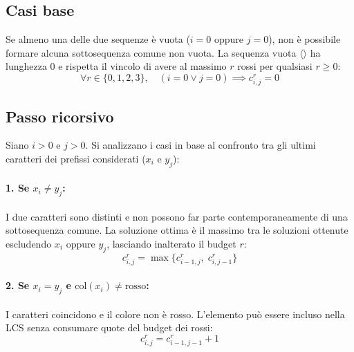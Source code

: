 \subsection{Casi base}
Se almeno una delle due sequenze è vuota ($i = 0$ oppure $j = 0$), non è possibile formare alcuna sottosequenza comune non vuota. La sequenza vuota $\langle \rangle$ ha lunghezza $0$ e rispetta il vincolo di avere al massimo $r$ rossi per qualsiasi $r \ge 0$:
\begin{equation}
    \forall r \in \{0, 1, 2, 3\}, \quad (i = 0 \lor j = 0) \implies c_{i,j}^r = 0
\end{equation}

\subsection{Passo ricorsivo}
Siano $i > 0$ e $j > 0$. Si analizzano i casi in base al confronto tra gli ultimi caratteri dei prefissi considerati ($x_i$ e $y_j$):

\paragraph{1. Se $x_i \ne y_j$:}
I due caratteri sono distinti e non possono far parte contemporaneamente di una sottosequenza comune. La soluzione ottima è il massimo tra le soluzioni ottenute escludendo $x_i$ oppure $y_j$, lasciando inalterato il budget $r$:
\begin{equation}
    c_{i,j}^r = \max\{c_{i-1, j}^r, \; c_{i, j-1}^r\}
\end{equation}

\paragraph{2. Se $x_i = y_j$ e $\text{col}(x_i) \ne \text{rosso}$:}
I caratteri coincidono e il colore non è rosso. L'elemento può essere incluso nella LCS senza consumare quote del budget dei rossi:
\begin{equation}
    c_{i,j}^r = c_{i-1, j-1}^r + 1
\end{equation}

